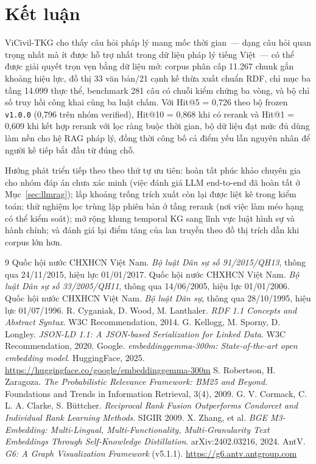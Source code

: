 \documentclass[12pt,a4paper]{report}
\renewcommand{\_}{\textunderscore\allowbreak}
\begin{document}
\section{Kết luận}\label{sec:conclusion}

ViCivil-TKG cho thấy câu hỏi pháp lý mang mốc thời gian~--- dạng câu hỏi quan trọng nhất mà ít được hỗ trợ nhất trong dữ liệu pháp lý tiếng Việt~--- có thể được giải quyết trọn vẹn bằng dữ liệu mở: corpus phân cấp 11.267 chunk gắn khoảng hiệu lực, đồ thị 33 văn bản/21 cạnh kế thừa xuất chuẩn RDF, chỉ mục ba tầng 14.099 thực thể, benchmark 281 câu có chuỗi kiểm chứng ba vòng, và bộ chỉ số truy hồi công khai cùng ba luật chấm. Với Hit@5 = 0,726 theo bộ frozen \texttt{v1.0.0} (0,796 trên nhóm verified), Hit@10 = 0,868 khi có rerank và Hit@1 = 0,609 khi kết hợp rerank với lọc ràng buộc thời gian, bộ dữ liệu đạt mức đủ dùng làm nền cho hệ RAG pháp lý, đồng thời công bố cả điểm yếu lẫn nguyên nhân để người kế tiếp bắt đầu từ đúng chỗ.

Hướng phát triển tiếp theo theo thứ tự ưu tiên: hoàn tất phúc khảo chuyên gia cho nhóm đáp án chưa xác minh (việc đánh giá LLM end-to-end đã hoàn tất ở Mục~\ref{sec:llmrag}); lấp khoảng trống trích xuất còn lại được liệt kê trong kiểm toán; thử nghiệm lọc trùng lặp phiên bản ở tầng rerank (nơi việc làm méo hạng có thể kiểm soát); mở rộng khung temporal KG sang lĩnh vực luật hình sự và hành chính; và đánh giá lại điểm tăng của lan truyền theo đồ thị trích dẫn khi corpus lớn hơn.

\begin{thebibliography}{9}
\sloppy{} %
 Quốc hội nước CHXHCN Việt Nam. \emph{Bộ luật Dân sự số 91/2015/QH13}, thông qua 24/11/2015, hiệu lực 01/01/2017.
 Quốc hội nước CHXHCN Việt Nam. \emph{Bộ luật Dân sự số 33/2005/QH11}, thông qua 14/06/2005, hiệu lực 01/01/2006.
 Quốc hội nước CHXHCN Việt Nam. \emph{Bộ luật Dân sự}, thông qua 28/10/1995, hiệu lực 01/07/1996.
 R. Cyganiak, D. Wood, M. Lanthaler. \emph{RDF 1.1 Concepts and Abstract Syntax}. W3C Recommendation, 2014.
 G. Kellogg, M. Sporny, D. Longley. \emph{JSON-LD 1.1: A JSON-based Serialization for Linked Data}. W3C Recommendation, 2020.
 Google. \emph{embeddinggemma-300m: State-of-the-art open embedding model}. HuggingFace, 2025. \url{https://huggingface.co/google/embeddinggemma-300m}
 S. Robertson, H. Zaragoza. \emph{The Probabilistic Relevance Framework: BM25 and Beyond}. Foundations and Trends in Information Retrieval, 3(4), 2009.
 G. V. Cormack, C. L. A. Clarke, S. Büttcher. \emph{Reciprocal Rank Fusion Outperforms Condorcet and Individual Rank Learning Methods}. SIGIR 2009.
 X. Zhang, et al. \emph{BGE M3-Embedding: Multi-Lingual, Multi-Functionality, Multi-Granularity Text Embeddings Through Self-Knowledge Distillation}. arXiv:2402.03216, 2024.
 AntV. \emph{G6: A Graph Visualization Framework} (v5.1.1). \url{https://g6.antv.antgroup.com}
\end{thebibliography}
\end{document}
